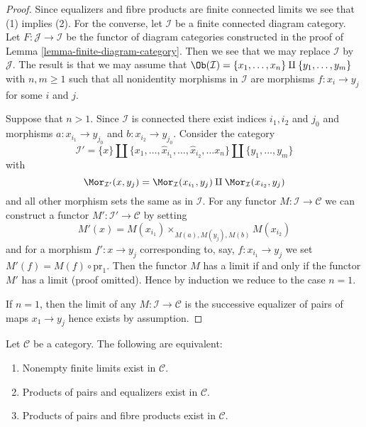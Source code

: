 \begin{proof}
Since equalizers and fibre products are finite connected
limits we see that (1) implies (2). For the converse, let $\mathcal{I}$
be a finite connected diagram category. Let
$F : \mathcal{J} \to \mathcal{I}$
be the functor of diagram categories constructed in the proof of
Lemma \ref{lemma-finite-diagram-category}.
Then we see that we may replace $\mathcal{I}$ by $\mathcal{J}$.
The result is that we may assume that
$\Ob(\mathcal{I}) = \{x_1, \ldots, x_n\} \amalg \{y_1, \ldots, y_m\}$
with $n, m \geq 1$ such that all nonidentity morphisms in $\mathcal{I}$
are morphisms $f : x_i \to y_j$ for some $i$ and $j$.

\medskip\noindent
Suppose that $n > 1$. Since $\mathcal{I}$ is connected there
exist indices $i_1, i_2$ and $j_0$ and morphisms $a : x_{i_1} \to y_{j_0}$
and $b : x_{i_2} \to y_{j_0}$. Consider the category
$$
\mathcal{I}' =
\{x\} \amalg \{x_1, \ldots, \hat x_{i_1}, \ldots, \hat x_{i_2}, \ldots x_n\}
\amalg \{y_1, \ldots, y_m\}
$$
with
$$
\Mor_{\mathcal{I}'}(x, y_j) = \Mor_\mathcal{I}(x_{i_1}, y_j)
\amalg \Mor_\mathcal{I}(x_{i_2}, y_j)
$$
and all other morphism sets the same as in $\mathcal{I}$. For any functor
$M : \mathcal{I} \to \mathcal{C}$ we can construct a functor
$M' : \mathcal{I}' \to \mathcal{C}$ by setting
$$
M'(x) = M(x_{i_1}) \times_{M(a), M(y_j), M(b)} M(x_{i_2})
$$
and for a morphism $f' : x \to y_j$ corresponding to, say,
$f : x_{i_1} \to y_j$ we set $M'(f) = M(f) \circ \text{pr}_1$.
Then the functor $M$ has a limit if and only if the functor $M'$ has
a limit (proof omitted). Hence by induction we reduce to the case $n = 1$.

\medskip\noindent
If $n = 1$, then the limit of any $M : \mathcal{I} \to \mathcal{C}$ is
the successive equalizer of pairs of maps $x_1 \to y_j$ hence
exists by assumption.
\end{proof}

\begin{lemma}
\label{lemma-almost-finite-limits-exist}
Let $\mathcal{C}$ be a category.
The following are equivalent:
\begin{enumerate}
\item Nonempty finite limits exist in $\mathcal{C}$.
\item Products of pairs and equalizers exist in $\mathcal{C}$.
\item Products of pairs and fibre products exist in $\mathcal{C}$.
\end{enumerate}
\end{lemma}

